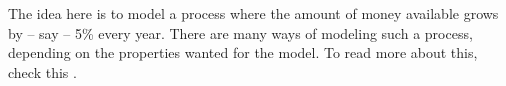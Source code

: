 The idea here is to model a process where the amount of money available grows by -- say -- 5\% every year. There are many ways of modeling such a process, depending on the properties wanted for the model. To read more about this, check this . \\
























